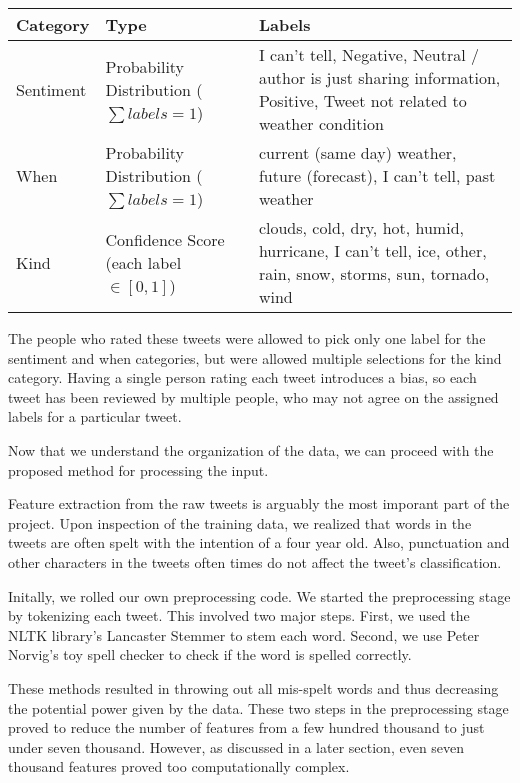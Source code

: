 \documentclass{article}
\begin{document}
\begin{center}
    \begin{tabular}{ | l | p{3.7cm} | p{7.3cm} |}
    \hline
    Category & Type & Labels \\ \hline
    Sentiment & Probability Distribution ($\sum labels = 1$) & I can't tell, Negative, Neutral / author is just sharing information, Positive, Tweet not related to weather condition \\ \hline
    When & Probability Distribution ($\sum labels = 1$) & current (same day) weather, future (forecast), I can't tell, past weather \\ \hline
    Kind & Confidence Score (each label $\in [0,1]$) & clouds, cold, dry, hot, humid, hurricane, I can't tell, ice, other, rain, snow, storms, sun, tornado, wind \\ \hline
    \end{tabular}
\end{center}

The people who rated these tweets were allowed to pick only one label for the sentiment and when categories, but were allowed multiple selections for the kind category. Having a single person rating each tweet introduces a bias, so each tweet has been reviewed by multiple people, who may not agree on the assigned labels for a particular tweet. 

Now that we understand the organization of the data, we can proceed with the proposed method for processing the input.

Feature extraction from the raw tweets is arguably the most imporant part of the project. Upon inspection of the training data, we realized that words in the tweets are often spelt with the intention of a four year old. Also, punctuation and other characters in the tweets often times do not affect the tweet's classification.

Initally, we rolled our own preprocessing code. We started the preprocessing stage by tokenizing each tweet. This involved two major steps. First, we used the NLTK library's Lancaster Stemmer to stem each word. Second, we use Peter Norvig's toy spell checker to check if the word is spelled correctly.

These methods resulted in throwing out all mis-spelt words and thus decreasing the potential power given by the data. These two steps in the preprocessing stage proved to reduce the number of features from a few hundred thousand to just under seven thousand. However, as discussed in a later section, even seven thousand features proved too computationally complex.
\end{document}
